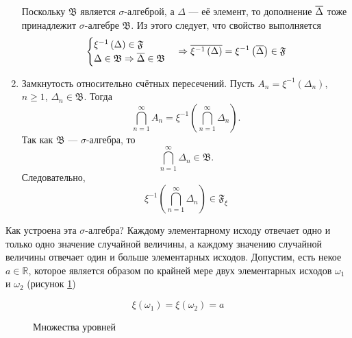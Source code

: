 \begin{enumerate}
      Поскольку $\mathfrak{B}$ является $\sigma$-алгеброй,
      а $\Delta$ --- её элемент,
      то дополнение $\overline{\Delta}$ тоже принадлежит
      $\sigma$-алгебре $\mathfrak{B}$.
      Из этого следует, что свойство выполняется
      \begin{align*}
      \begin{cases}
          \xi^{-1}\left( \Delta \right) \in \mathfrak{F}\\
          \Delta \in \mathfrak{B}
        \Rightarrow \overline{\Delta} \in \mathfrak{B}
      \end{cases}
      \Rightarrow
      \overline{\xi^{-1}\left( \Delta \right)}
          = \xi^{-1}\left( \overline{\Delta} \right) \in \mathfrak{F}
      \end{align*}
  \item Замкнутость относительно счётных пересечений.
    Пусть $A_n = \xi^{-1}\left( \Delta_n \right)$, $n \ge 1$,
    $\Delta_n \in \mathfrak{B}$.
    Тогда
    \begin{equation*}
      \bigcap_{n=1}^{\infty} A_n
      = \xi^{-1}\left( \bigcap_{n=1}^{\infty} \Delta_n \right).
    \end{equation*}
    Так как $\mathfrak{B}$ --- $\sigma$-алгебра, то
    \begin{equation*}
      \bigcap_{n=1}^{\infty} \Delta_n \in \mathfrak{B}.
    \end{equation*}
    Следовательно,
    \begin{equation*}
      \xi^{-1}\left( \bigcap_{n=1}^{\infty} \Delta_n \right)
      \in \mathfrak{F}_{\xi}
    \end{equation*}
\end{enumerate}

Как устроена эта $\sigma$-алгебра?
Каждому элементарному исходу отвечает одно и только одно значение
случайной величины, а каждому значению случайной величины
отвечает один и больше элементарных исходов.
Допустим, есть некое $a\in\mathbb{R}$, которое является образом по крайней мере
двух элементарных исходов $\omega_1$ и $\omega_2$
(рисунок \ref{fig:tikz:indistinguishableValuesImage})

$$\xi\left( \omega_1 \right) = \xi\left( \omega_2 \right) = a$$

\begin{figure}[h!]
  \center
  \caption{Множества уровней}
  \label{fig:tikz:indistinguishableValuesImage}
\end{figure}


